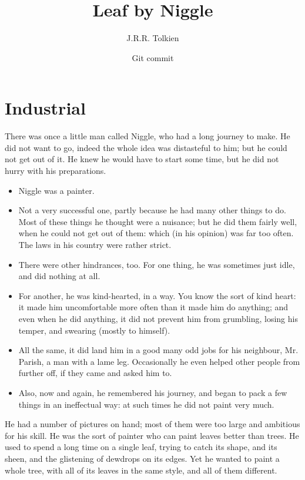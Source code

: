 \documentclass[english]{scrartcl}
\begin{document}
\title{Leaf by Niggle}
\author{J.R.R. Tolkien}
\date{Git commit \gitFirstTagDescribe}
\maketitle

\section*{Industrial}

There was once a little man called Niggle, who had a long journey to make. He did not want to go, indeed the whole idea was distasteful to him; but he could not get out of it. He knew he would have to start some time, but he did not hurry with his preparations.

\begin{itemize}
\item Niggle was a painter.
\item Not a very successful one, partly because he had many other things to do. Most of these things he thought were a nuisance; but he did them fairly well, when he could not get out of them: which (in his opinion) was far too often. The laws in his country were rather strict.
\item There were other hindrances, too. For one thing, he was sometimes just idle, and did nothing at all.
\item For another, he was kind-hearted, in a way. You know the sort of kind heart: it made him uncomfortable more often than it made him do anything; and even when he did anything, it did not prevent him from grumbling, losing his temper, and swearing (mostly to himself).
\item All the same, it did land him in a good many odd jobs for his neighbour, Mr. Parish, a man with a lame leg. Occasionally he even helped other people from further off, if they came and asked him to.
\item Also, now and again, he remembered his journey, and began to pack a few things in an ineffectual way: at such times he did not paint very much.
\end{itemize}

He had a number of pictures on hand; most of them were too large and ambitious for his skill. He was the sort of painter who can paint leaves better than trees. He used to spend a long time on a single leaf, trying to catch its shape, and its sheen, and the glistening of dewdrops on its edges. Yet he wanted to paint a whole tree, with all of its leaves in the same style, and all of them different.
\end{document}

